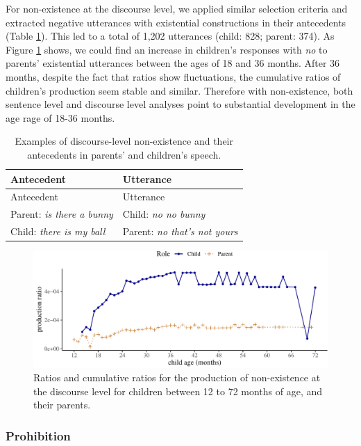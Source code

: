 \documentclass[
  english,
  man,floatsintext]{apa6}
\begin{document}
For non-existence at the discourse level, we applied similar selection criteria and extracted negative utterances with existential constructions in their antecedents (Table \ref{tab:disexist}). This led to a total of 1,202 utterances (child: 828; parent: 374). As Figure \ref{fig:existencediscourse} shows, we could find an increase in children's responses with \emph{no} to parents' existential utterances between the ages of 18 and 36 months. After 36 months, despite the fact that ratios show fluctuations, the cumulative ratios of children's production seem stable and similar. Therefore with non-existence, both sentence level and discourse level analyses point to substantial development in the age rage of 18-36 months.

\begin{longtable}[]{@{}ll@{}}
\caption{\label{tab:disexist} Examples of discourse-level non-existence and their antecedents in parents' and children's speech.}\tabularnewline
\toprule
Antecedent & Utterance \\
\midrule
\endfirsthead
\toprule
Antecedent & Utterance \\
\midrule
\endhead
Parent: \emph{is there a bunny} & Child: \emph{no no bunny} \\
Child: \emph{there is my ball} & Parent: \emph{no that's not yours} \\
\bottomrule
\end{longtable}

\begin{figure}[H]

{\centering \includegraphics{neg_construction_article_files/figure-latex/existencediscourse-1} 

}

\caption{Ratios and cumulative ratios for the production of non-existence at the discourse level for children between 12 to 72 months of age, and their parents.}\label{fig:existencediscourse}
\end{figure}

\hypertarget{prohibition}{%
\subsubsection{Prohibition}\label{prohibition}}
\end{document}
